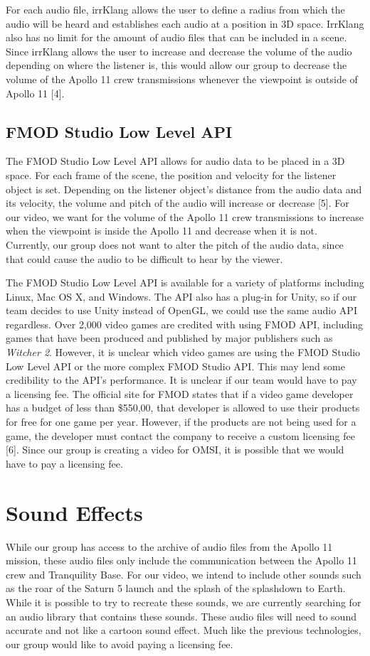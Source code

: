 \documentclass[onecolumn, draftclsnofoot,10pt, compsoc]{IEEEtran}
\begin{document}
For each audio file, irrKlang allows the user to define a radius from which the audio will be heard and establishes each audio at a position in 3D space. IrrKlang also has no limit for the amount of audio files that can be included in a scene. Since irrKlang allows the user to increase and decrease the volume of the audio depending on where the listener is, this would allow our group to decrease the volume of the Apollo 11 crew transmissions whenever the viewpoint is outside of Apollo 11 [4]. 

\subsection{FMOD Studio Low Level API}
The FMOD Studio Low Level API allows for audio data to be placed in a 3D space. For each frame of the scene, the position and velocity for the listener object is set. Depending on the listener object's distance from the audio data and its velocity, the volume and pitch of the audio will increase or decrease [5]. For our video, we want for the volume of the Apollo 11 crew transmissions to increase when the viewpoint is inside the Apollo 11 and decrease when it is not. Currently, our group does not want to alter the pitch of the audio data, since that could cause the audio to be difficult to hear by the viewer.

The FMOD Studio Low Level API is available for a variety of platforms including Linux, Mac OS X, and Windows. The API also has a plug-in for Unity, so if our team decides to use Unity instead of OpenGL, we could use the same audio API regardless. Over 2,000 video games are credited with using FMOD API, including games that have been produced and published by major publishers such as \textit{Witcher 2}. However, it is unclear which video games are using the FMOD Studio Low Level API or the more complex FMOD Studio API. This may lend some credibility to the API's performance. It is unclear if our team would have to pay a licensing fee. The official site for FMOD states that if a video game developer has a budget of less than \$550,00, that developer is allowed to use their products for free for one game per year. However, if the products are not being used for a game, the developer must contact the company to receive a custom licensing fee [6]. Since our group is creating a video for OMSI, it is possible that we would have to pay a licensing fee.

\section{Sound Effects}
While our group has access to the archive of audio files from the Apollo 11 mission, these audio files only include the communication between the Apollo 11 crew and Tranquility Base. For our video, we intend to include other sounds such as the roar of the Saturn 5 launch and the splash of the splashdown to Earth. While it is possible to try to recreate these sounds, we are currently searching for an audio library that contains these sounds. These audio files will need to sound accurate and not like a cartoon sound effect. Much like the previous technologies, our group would like to avoid paying a licensing fee.
\end{document}
